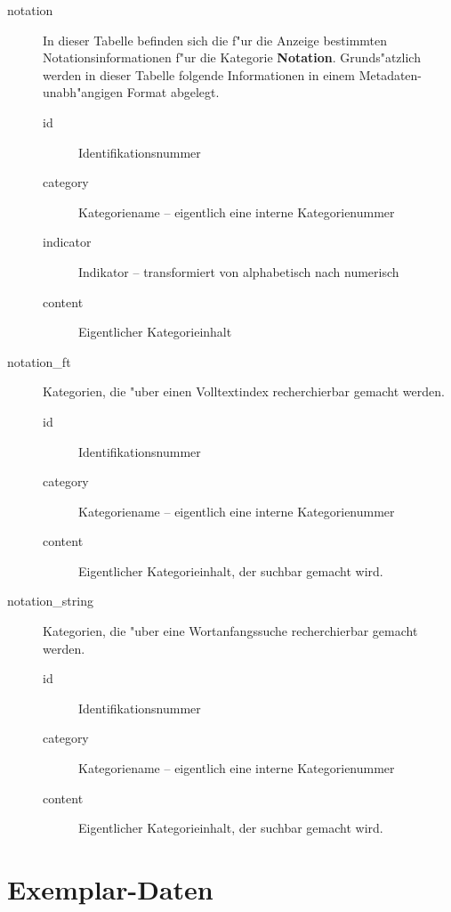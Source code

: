 \documentclass[11pt, twoside, a4paper, BCOR8mm, DIV12, bibtotoc,idxtotoc]{scrbook}
\begin{document}
\begin{description}
\item[notation] In dieser Tabelle befinden sich die f"ur die Anzeige
  bestimmten Notationsinformationen f"ur die Kategorie
  \textbf{Notation}. Grunds"atzlich werden in dieser Tabelle
  folgende Informationen in einem Metadaten-unabh"angigen Format
  abgelegt.
  \begin{description}
  \item[id] Identifikationsnummer
  \item[category] Kategoriename -- eigentlich eine interne Kategorienummer
  \item[indicator] Indikator -- transformiert von alphabetisch nach numerisch
  \item[content] Eigentlicher Kategorieinhalt
  \end{description}
\item[notation\_ft] Kategorien, die "uber einen Volltextindex recherchierbar
  gemacht werden.
  \begin{description}
  \item[id] Identifikationsnummer
  \item[category] Kategoriename -- eigentlich eine interne Kategorienummer
  \item[content] Eigentlicher Kategorieinhalt, der suchbar gemacht wird.
  \end{description}
\item[notation\_string] Kategorien, die "uber eine Wortanfangssuche
  recherchierbar gemacht werden.
  \begin{description}
  \item[id] Identifikationsnummer
  \item[category] Kategoriename -- eigentlich eine interne Kategorienummer
  \item[content] Eigentlicher Kategorieinhalt, der suchbar gemacht wird.
  \end{description}
\end{description}

\section{Exemplar-Daten}
\end{document}
